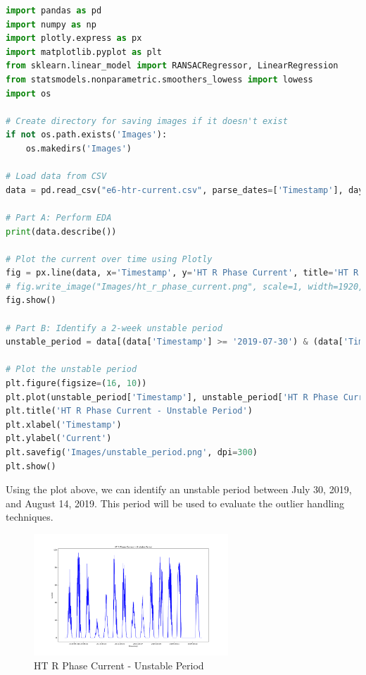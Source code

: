 \begin{lstlisting}[language=Python]
import pandas as pd
import numpy as np
import plotly.express as px
import matplotlib.pyplot as plt
from sklearn.linear_model import RANSACRegressor, LinearRegression
from statsmodels.nonparametric.smoothers_lowess import lowess
import os

# Create directory for saving images if it doesn't exist
if not os.path.exists('Images'):
    os.makedirs('Images')

# Load data from CSV
data = pd.read_csv("e6-htr-current.csv", parse_dates=['Timestamp'], dayfirst=True)

# Part A: Perform EDA
print(data.describe())

# Plot the current over time using Plotly
fig = px.line(data, x='Timestamp', y='HT R Phase Current', title='HT R Phase Current over Time')
# fig.write_image("Images/ht_r_phase_current.png", scale=1, width=1920, height=1080, format='png')
fig.show()

# Part B: Identify a 2-week unstable period
unstable_period = data[(data['Timestamp'] >= '2019-07-30') & (data['Timestamp'] <= '2019-08-14')].copy()

# Plot the unstable period
plt.figure(figsize=(16, 10))
plt.plot(unstable_period['Timestamp'], unstable_period['HT R Phase Current'], color='blue')
plt.title('HT R Phase Current - Unstable Period')
plt.xlabel('Timestamp')
plt.ylabel('Current')
plt.savefig('Images/unstable_period.png', dpi=300)
plt.show()
\end{lstlisting}

Using the plot above, we can identify an unstable period between July 30, 2019, and August 14, 2019. This period will be used to evaluate the outlier handling techniques.

\begin{figure}[H]
	\centering
	\includegraphics[width=0.65\textwidth]{./Images/unstable_period.png}
	\caption{HT R Phase Current - Unstable Period}
\end{figure}

